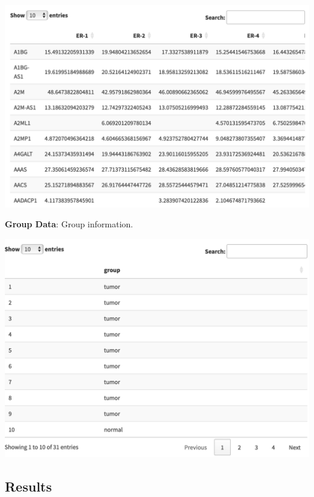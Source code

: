 \documentclass[
]{book}
\begin{document}
\includegraphics[width=22.42in]{figure/GeneExp}

\textbf{Group Data}: Group information.

\begin{flushleft}\includegraphics[width=21.83in]{figure/GroupInfo} \end{flushleft}

\subsection{Results}\label{results-1}
\end{document}
